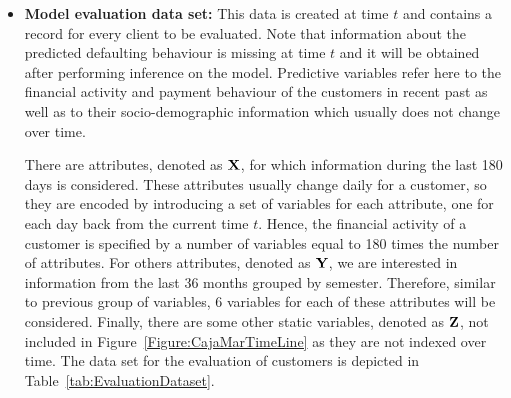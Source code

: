 \begin{itemize}

\item \textbf{Model evaluation data set:} This data is created at time $t$ and contains a record for every client to be evaluated. Note that information about the predicted defaulting behaviour is missing at time $t$ and it will be obtained after performing inference on the model. Predictive variables refer here to the financial activity and payment behaviour of the customers in recent past as well as to their socio-demographic information which usually does not change over time. 

There are attributes, denoted as $\mathbf{X}$, for which information during the last 180 days is considered. 
These attributes usually change daily for a customer, so they are encoded by introducing a set of variables for each attribute, one for each day back from the current time $t$. Hence, the financial activity of a customer is specified by a number of variables equal to 180 times the number of attributes. For others attributes, denoted as $\mathbf{Y}$, we are interested in information from the last $36$ months grouped by semester. 
Therefore, similar to previous group of variables, $6$ variables for each of these attributes will be considered. Finally, there are some other static variables, denoted as $\mathbf{Z}$, not included in Figure~\ref{Figure:CajaMarTimeLine} as they are not indexed over time. The data set for the evaluation of customers is depicted in Table~\ref{tab:EvaluationDataset}. 





\end{itemize}
